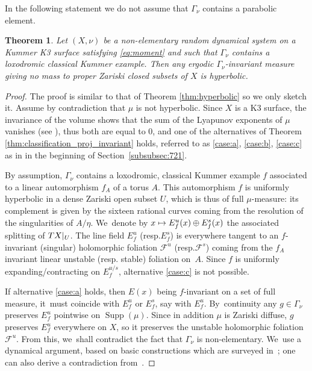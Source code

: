 \documentclass[11pt]{article}
\newcommand{\resp}{resp.\xspace}
\newcommand\mto{\mathchoice{\longmapsto}{\mapsto}{\mapsto}{\mapsto}}
\newcommand{\rest}[1]{ \arrowvert_{#1}}
\DeclareMathOperator{\supp}{Supp}
\theoremstyle{plain}
\newtheorem{thm}{Theorem}[section]
\theoremstyle{definition}
\numberwithin{equation}{section}
\begin{document}
In the following statement we do not assume that $\Gamma_\nu$ contains a parabolic element.

\begin{thm} \label{thm:hyperbolic_kummer}
Let $(X, \nu)$ be a non-elementary random dynamical system on a Kummer K3 surface satisfying
\eqref{eq:moment} and such that $\Gamma_\nu$ contains a loxodromic classical Kummer example. Then
any ergodic $\Gamma_\nu$-invariant
measure giving no mass to proper Zariski closed subsets of $X$ is hyperbolic.
\end{thm}

\begin{proof}
The proof is similar to that of Theorem \ref{thm:hyperbolic} so we only sketch it. Assume by contradiction that $\mu$ is
not hyperbolic. Since $X$ is a K3 surface, the invariance of the volume
shows that the sum of the Lyapunov exponents of $\mu$ vanishes (see \cite[\S 7.3]{stiffness}), thus both are
equal to $0$, and one of the alternatives of Theorem \ref{thm:classification_proj_invariant} holds, referred to as \eqref{case:a}, \eqref{case:b}, \eqref{case:c} as in in the beginning of Section~\ref{subsubsec:721}.

By assumption, $\Gamma_\nu$ contains a loxodromic, classical Kummer example $f$ associated to a linear automorphism $f_A$ of a torus $A$. This automorphism $f$ is uniformly
hyperbolic in a dense Zariski open subset $U$, which is thus of full $\mu$-measure: its complement is given by the sixteen rational curves
coming from the resolution of the singularities of $A/\eta$. We~denote by $x\mto E^u_f(x)\oplus E^s_f(x)$
the associated splitting of $TX\rest{U}$. The line field $E^u_f$ (\resp $E^s_f$) is everywhere tangent
to an $f$-invariant (singular) holomorphic foliation $\mathcal F^u$ (\resp $\mathcal F^s$) coming from the $f_A$ invariant linear unstable (\resp stable) foliation on~$A$.
Since $f$ is uniformly expanding/contracting on $E^{u/s}_f$, alternative \eqref{case:c} is not possible.

If alternative \eqref{case:a} holds, then $E(x)$ being $f$-invariant on a set of full
measure, it~must coincide with $E^u_f$ or $E^s_f$, say with $E^u_f$. By~continuity any $g\in \Gamma_\nu$ preserves
$E^u_f$ pointwise on $\supp(\mu)$.
Since in addition $\mu$ is Zariski diffuse, $g$
preserves $E^u_f$ everywhere on $X$, so it
preserves the unstable holomorphic foliation $\mathcal F^u$.
From this, we~shall contradict
the fact that $\Gamma_\nu$ is non-elementary. We~use a dynamical argument, based on basic constructions which are surveyed in~\cite{Cantat:Milnor}; one can also derive a contradiction from~\cite{Cantat-Favre}.


\end{proof}
\end{document}
